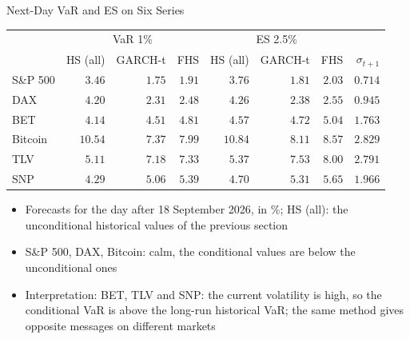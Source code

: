 \begin{frame}{Next-Day VaR and ES on Six Series}
\itemsize{\footnotesize}
\begin{center}
\footnotesize
\begin{tabular}{lrrrrrrr}
\toprule
& \multicolumn{3}{c}{VaR 1\%} & \multicolumn{3}{c}{ES 2.5\%} & \\ & HS (all) & GARCH-t & FHS & HS (all) & GARCH-t & FHS & $\sigma_{t+1}$ \\
\midrule
S\&P 500 & $3.46$ & $1.75$ & $1.91$ & $3.76$ & $1.81$ & $2.03$ & $0.714$ \\
DAX & $4.20$ & $2.31$ & $2.48$ & $4.26$ & $2.38$ & $2.55$ & $0.945$ \\
BET & $4.14$ & $4.51$ & $4.81$ & $4.57$ & $4.72$ & $5.04$ & $1.763$ \\
Bitcoin & $10.54$ & $7.37$ & $7.99$ & $10.84$ & $8.11$ & $8.57$ & $2.829$ \\
TLV & $5.11$ & $7.18$ & $7.33$ & $5.37$ & $7.53$ & $8.00$ & $2.791$ \\
SNP & $4.29$ & $5.06$ & $5.39$ & $4.70$ & $5.31$ & $5.65$ & $1.966$ \\
\bottomrule
\end{tabular}
\end{center}
\begin{itemize}
    \item Forecasts for the day after 18 September 2026, in \%; HS (all): the unconditional historical values of the previous section
    \item S\&P 500, DAX, Bitcoin: calm, the conditional values are below the unconditional ones
    \item Interpretation: BET, TLV and SNP: the current volatility is high, so the conditional VaR is above the long-run historical VaR; the same method gives opposite messages on different markets
\end{itemize}
\end{frame}

